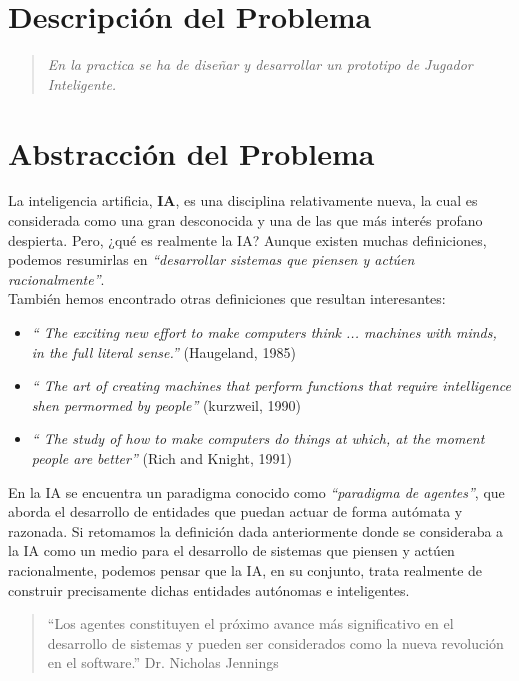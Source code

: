 \documentclass[a4paper,12pt,oneside]{book}
\begin{document}
\section{Descripción del Problema}
\begin{quote}
    {\it En la practica se ha de diseñar
    y desarrollar un prototipo de
    Jugador Inteligente. }
\end{quote}
\section{Abstracción del Problema}
La inteligencia artificia, {\bf IA}, es una disciplina relativamente
nueva, la cual es considerada como una gran desconocida y una de las
que más interés profano despierta. Pero, {¿qué es realmente la IA?}
Aunque existen muchas definiciones, podemos resumirlas en {\it
  ``desarrollar sistemas que piensen y actúen racionalmente''}.\\

También hemos encontrado otras definiciones que resultan interesantes:
\begin{itemize}
\item {\it `` The exciting new effort to make computers think ... machines
  with minds, in the full literal sense.''} (Haugeland, 1985)\\
\item {\it `` The art of creating machines that perform functions that
  require intelligence shen permormed by people''} (kurzweil, 1990)\\
\item {\it `` The study of how to make computers do things at which, at the
  moment people are better''} (Rich and Knight, 1991)\\
\end{itemize}
En la IA se encuentra un paradigma conocido como {\it ``paradigma de
  agentes''}, que aborda el desarrollo de entidades que puedan actuar
de forma autómata y razonada. Si retomamos la definición dada
anteriormente donde se consideraba a la IA como un medio para el
desarrollo de sistemas que piensen y actúen racionalmente, podemos
pensar que la IA, en su conjunto, trata realmente de construir
precisamente dichas entidades autónomas e inteligentes.
\begin{quote}
 ``Los agentes constituyen el próximo avance más significativo en el
 desarrollo de sistemas y pueden ser considerados como la nueva
 revolución en el software.''
 Dr. Nicholas Jennings
\end{quote}
\end{document}
